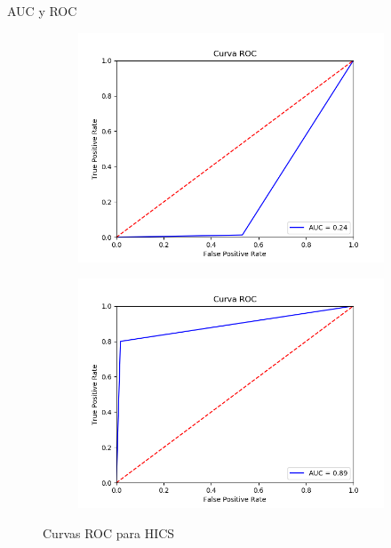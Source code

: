 \documentclass[10pt]{beamer}
\begin{document}
\begin{frame}[fragile]{AUC y ROC}
\vspace{10px}

\begin{figure}[H]
	\centering
	\begin{subfigure}{.49\textwidth}
		\centering
		\includegraphics[scale=0.35]{Imagenes/roc/HICS_breastw}
	\end{subfigure}
	\begin{subfigure}{.49\textwidth}
		\centering
		\includegraphics[scale=0.35]{Imagenes/roc/HICS_wine}
	\end{subfigure}
	\caption*{Curvas ROC para HICS}
	\label{ROC_HICS}
\end{figure}

\end{frame}
\end{document}
